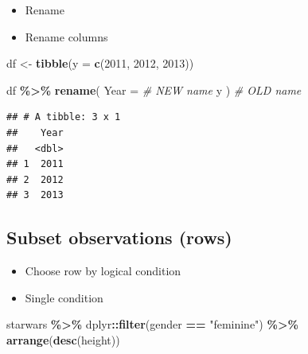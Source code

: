\documentclass[
]{book}
\newenvironment{Shaded}{\begin{snugshade}}{\end{snugshade}}
\newcommand{\AttributeTok}[1]{\textcolor[rgb]{0.13,0.29,0.53}{#1}}
\newcommand{\CommentTok}[1]{\textcolor[rgb]{0.56,0.35,0.01}{\textit{#1}}}
\newcommand{\DecValTok}[1]{\textcolor[rgb]{0.00,0.00,0.81}{#1}}
\newcommand{\FunctionTok}[1]{\textcolor[rgb]{0.13,0.29,0.53}{\textbf{#1}}}
\newcommand{\NormalTok}[1]{#1}
\newcommand{\OtherTok}[1]{\textcolor[rgb]{0.56,0.35,0.01}{#1}}
\newcommand{\SpecialCharTok}[1]{\textcolor[rgb]{0.81,0.36,0.00}{\textbf{#1}}}
\newcommand{\StringTok}[1]{\textcolor[rgb]{0.31,0.60,0.02}{#1}}
\begin{document}
\begin{itemize}
\item
  Rename
\item
  Rename columns
\end{itemize}

\begin{Shaded}
\begin{Highlighting}[]
\NormalTok{df }\OtherTok{\textless{}{-}} \FunctionTok{tibble}\NormalTok{(}\AttributeTok{y =} \FunctionTok{c}\NormalTok{(}\DecValTok{2011}\NormalTok{, }\DecValTok{2012}\NormalTok{, }\DecValTok{2013}\NormalTok{))}

\NormalTok{df }\SpecialCharTok{\%\textgreater{}\%}
  \FunctionTok{rename}\NormalTok{(}
    \AttributeTok{Year =} \CommentTok{\# NEW name}
\NormalTok{      y}
\NormalTok{  ) }\CommentTok{\# OLD name}
\end{Highlighting}
\end{Shaded}

\begin{verbatim}
## # A tibble: 3 x 1
##    Year
##   <dbl>
## 1  2011
## 2  2012
## 3  2013
\end{verbatim}

\subsection{Subset observations (rows)}\label{subset-observations-rows}

\begin{itemize}
\item
  Choose row by logical condition
\item
  Single condition
\end{itemize}

\begin{Shaded}
\begin{Highlighting}[]
\NormalTok{starwars }\SpecialCharTok{\%\textgreater{}\%}
\NormalTok{  dplyr}\SpecialCharTok{::}\FunctionTok{filter}\NormalTok{(gender }\SpecialCharTok{==} \StringTok{"feminine"}\NormalTok{) }\SpecialCharTok{\%\textgreater{}\%}
  \FunctionTok{arrange}\NormalTok{(}\FunctionTok{desc}\NormalTok{(height))}
\end{Highlighting}
\end{Shaded}
\end{document}
